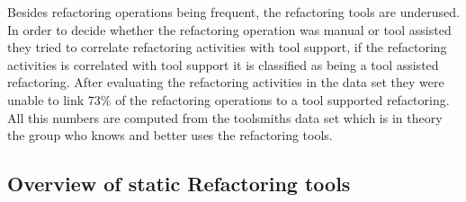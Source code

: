 Besides refactoring operations being frequent, the refactoring tools are underused. In order to decide whether the refactoring operation was manual or tool assisted they tried to correlate refactoring activities with tool support, if the refactoring activities is correlated with tool support it is classified as being a tool assisted refactoring.
After evaluating the refactoring activities in the data set they were unable to link 73\% of the refactoring operations to a tool supported refactoring. 
All this numbers are computed from the toolsmiths data set which is in theory the group who knows and better uses the refactoring tools.


\subsection{Overview of static Refactoring tools}

